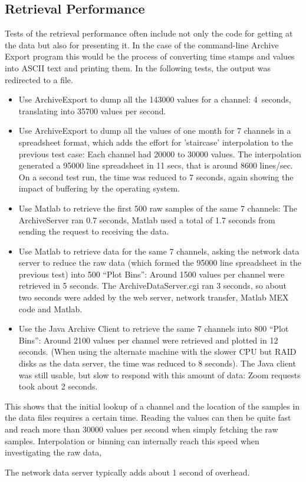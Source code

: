 \subsection{Retrieval Performance}
Tests of the retrieval performance often include not only the
code for getting at the data but also for presenting it. In the
case of the command-line Archive Export program this would be the process
of converting time stamps and values into ASCII text and printing them.
In the following tests, the output was redirected to a file.
\begin{itemize}
\item Use ArchiveExport to dump all the 143000 values for a channel:
      4~seconds, translating into 35700 values per second.
\item Use ArchiveExport to dump all the values of one month for 7
      channels in a spreadsheet format, which adds the effort for
      'staircase' interpolation to the previous test case:
      Each channel had 20000 to 30000 values. The interpolation generated
      a 95000 line spreadsheet in 11 secs, that is around 8600 lines/sec.
      On a second test run, the time was reduced to 7 seconds, again
      showing the impact of buffering by the operating system.
\item Use Matlab to retrieve the first 500 raw samples of the same 7 channels:
      The ArchiveServer ran 0.7 seconds, Matlab used a total of 1.7
      seconds from sending the request to receiving the data.
\item Use Matlab to retrieve data for the same 7 channels,
      asking the network data server to reduce the raw data (which
      formed the 95000 line spreadsheet in the previous test) into
      500 ``Plot Bins'':
      Around 1500 values per channel were retrieved in 5 seconds.
      The ArchiveDataServer.cgi ran 3 seconds, so about two
      seconds were added by the web server, network transfer, Matlab
      MEX code and Matlab.
\item Use the Java Archive Client to retrieve the same 7 channels into 800
      ``Plot Bins'':
      Around 2100 values per channel were retrieved and plotted in 12 seconds.
      (When using the alternate machine with the slower CPU but RAID disks as 
      the data server, the time was reduced to 8 seconds).
      The Java client was still usable, but slow to respond with this
      amount of data: Zoom requests took about 2 seconds.
\end{itemize}

This shows that the initial lookup of a channel and the location
of the samples in the data files requires a certain time.
Reading the values can then be quite fast and reach more than 30000
values per second when simply fetching the raw samples.
Interpolation or binning can internally reach this speed when
investigating the raw data, 


The network data server typically adds about 1 second of overhead.

